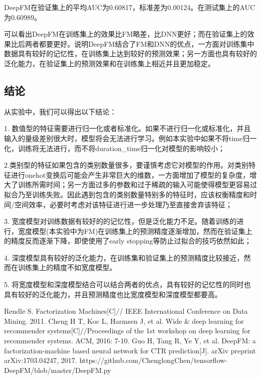 \documentclass[]{article}
\begin{document}
DeepFM在验证集上的平均AUC为0.60817，标准差为0.00124。在测试集上的AUC为0.60989。

可以看出DeepFM在训练集上的效果比FM略差，比DNN更好；而在验证集上的效果比后两者都要更好。说明DeepFM结合了FM和DNN的优点，一方面对训练集中数据具有较好的记忆性，在训练集上达到较好的预测效果；另一方面也具有较好的泛化能力，在验证集上的预测效果和在训练集上相近并且更加稳定。

\subsection{结论}
从实验中，我们可以得出以下结论：

1. 数值型的特征需要进行归一化或者标准化。如果不进行归一化或标准化，并且输入的量级差别很大时，模型将会无法进行学习。例如本实验中如果不将time归一化，训练将无法进行，而不将duration\_time归一化对模型的影响较小；

2.类别型的特征如果包含的类别数量很多，要谨慎考虑它对模型的作用。对类别特征进行onehot变换后可能会产生非常巨大的维数，一方面增加了模型的复杂度，增大了训练所需时间；另一方面过多的参数和过于稀疏的输入可能使得模型更容易过拟合乃至训练失败。因此遇到包含的类别数量特别多的特征时，应该权衡精度和时间/空间效率，必要时考虑对该特征进行进一步处理乃至直接舍弃该特征；

3. 宽度模型对训练数据有较好的的记忆性，但是泛化能力不足。随着训练的进行，宽度模型(本实验中为FM)在训练集上的预测精度逐渐增加，然而在验证集上的精度反而逐渐下降，即使使用了early stopping等防止过拟合的技巧依然如此；

4. 深度模型具有较好的泛化能力，在训练集和验证集上的预测精度比较接近，然而在训练集上的精度不如宽度模型。

5. 将宽度模型和深度模型结合可以结合两者的优点，具有较好的记忆性的同时也具有较好的泛化能力，并且预测精度也比宽度模型和深度模型都要高。


\begin{thebibliography}{}
	 Rendle S. Factorization Machines[C]// IEEE International Conference on Data Mining. 2011.
	 Cheng H T, Koc L, Harmsen J, et al. Wide \& deep learning for recommender systems[C]//Proceedings of the 1st workshop on deep learning for recommender systems. ACM, 2016: 7-10.
	 Guo H, Tang R, Ye Y, et al. DeepFM: a factorization-machine based neural network for CTR prediction[J]. arXiv preprint arXiv:1703.04247, 2017.
	 https://github.com/ChenglongChen/tensorflow-DeepFM/blob/master/DeepFM.py
\end{thebibliography}	
\end{document}
